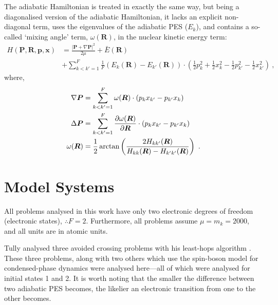 The adiabatic Hamiltonian is treated in exactly the same way, but being a diagonalised version of the adiabatic Hamiltonian, it lacks an explicit non-diagonal term, uses the eigenvalues of the adiabatic PES ($ E_{k} $), and contains a so-called `mixing angle' term, $ \omega(\bm{R}) $, in the nuclear kinetic energy term:
\begin{align}\label{e:adiab_ham}
H(\bm{P}, \bm{R}, \bm{p}, \bm{x}) &= 
\frac{|\bm{P}+\nabla\bm{P}|^{2}}{2\mu}+\bar{E}(\bm{R})\\
& +\sum\limits_{k<k'=1}^{F}
\frac{1}{F} (E_{k}(\bm{R})-E_{k'}(\bm{R}))
\cdot\left(
\frac{1}{2}p_{k}^{2}+\frac{1}{2}x_{k}^{2}-\frac{1}{2}p_{k'}^{2}-\frac{1}{2}x_{k'}^{2}\right)~, \nonumber
\end{align}
where,
\begin{subequations}
\begin{align}\label{e:def_adiab_ham}
\nabla\bm{P} &= \sum\limits_{k<k'=1}^{F} 
\omega(\bm{R})\cdot(p_{k}x_{k'}-p_{k'}x_{k})\\
\Delta \bm{P} &= \sum\limits_{k<k'=1}^{F} 
\frac{\partial \omega(\bm{R})}{\partial \bm{R}}\cdot(p_{k}x_{k'}-p_{k'}x_{k})\\
\omega(\bm{R}) &= 
\frac{1}{2}\arctan\left(\frac{2H_{kk'}(\bm{R})}{H_{kk}(\bm{R})-H_{k'k'}(\bm{R})}\right)~.
\end{align}
\end{subequations}
%
\section*{Model Systems}
%
All problems analysed in this work have only two electronic degrees of freedom (electronic states), $ \therefore  F = 2 $. Furthermore, all problems assume $ \mu = m_{k} = 2000 $, and all units are in atomic units.

Tully analysed three avoided crossing problems with his least-hops algorithm \cite{tully}. These three problems, along with two others which use the spin-boson model for condensed-phase dynamics were analysed here---all of which were analysed for initial states 1 and 2. It is worth noting that the smaller the difference between two adiabatic PES becomes, the likelier an electronic transition from one to the other becomes.
%

